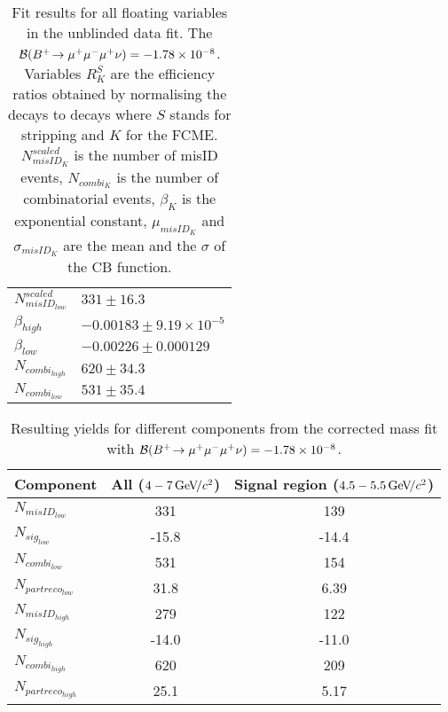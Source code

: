 \begin{table}[H]
\begin{tabular}{| l  l | }
$ N^{scaled}_{misID_{low}} $ & $331 \pm 16.3$ \\
$ \beta_{high} $ & $-0.00183 \pm 9.19\times 10^{-5}$ \\
$ \beta_{low} $ & $-0.00226 \pm 0.000129$ \\
$ N_{combi_{high}} $ & $620 \pm 34.3$ \\
$ N_{combi_{low}} $ & $531 \pm 35.4$ \\
\hline
\end{tabular}
\caption{Fit results for all floating variables in the unblinded data fit. The $\mathcal{B}({{{B}^+}}\!\rightarrow {\ensuremath{\mu^+\mu^-\mu^+}}\nu) =-1.78\times 10^{-8}$. Variables $R^{S}_{K}$ are the efficiency ratios obtained by normalising the decays to \bjpsimumuk decays where $S$ stands for stripping and $K$ for the FCME. $N^{scaled}_{misID_{K}}$ is the number of misID events, $N_{combi_{K}}$ is the number of combinatorial events, $\beta_{K}$ is the exponential constant, $\mu_{misID_{K}}$ and $\sigma_{misID_{K}}$ are the mean and the $\sigma$ of the CB function.}
\label{tab:floatingparsummary_fit}
\end{table}

\begin{table}[H]
\begin{center}
\begin{tabular}{| l | c | c |}
\hline
Component &  All ($4-7 {\mathrm{\,Ge\kern -0.1em V\!/}c^2}$) & Signal region ($4.5-5.5{\mathrm{\,Ge\kern -0.1em V\!/}c^2}$)  \\
\hline
$N_{misID_{low}}$  &  331 & 139 \\
$N_{sig_{low}}$  & -15.8  & -14.4 \\
$N_{combi_{low}}$  & 531 & 154 \\
$N_{partreco_{low}}$  & 31.8 & 6.39 \\
\hline
$N_{misID_{high}}$  &  279 & 122 \\
$N_{sig_{high}}$  &-14.0 & -11.0  \\
$N_{combi_{high}}$  & 620 & 209 \\
$N_{partreco_{high}}$ & 25.1 & 5.17 \\
\hline
\end{tabular}
\end{center}
\caption{Resulting yields for different components from the corrected mass fit with $\mathcal{B}({{{B}^+}}\!\rightarrow {\ensuremath{\mu^+\mu^-\mu^+}}\nu) =-1.78\times 10^{-8}$.}
\label{tab:yieldiatkos}
\end{table}


